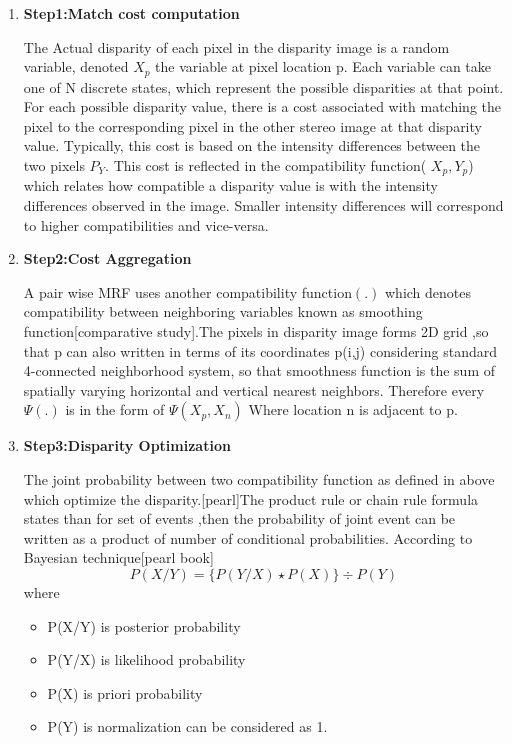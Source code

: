 \begin{enumerate}
  \item \textbf{Step1:Match cost computation}

 The Actual disparity of each pixel in the disparity image is a random variable, denoted $X_{p}$ the variable at pixel location p. Each variable can take one of N discrete states, which represent the possible disparities at that point. For each possible disparity value, there is a cost associated with matching the pixel to the corresponding pixel in the other stereo image at that disparity value. Typically, this cost is based on the intensity differences between the two pixels $ P_{Y}$. This cost is reflected in the compatibility function( $ X_{p} , Y_{p}$) which relates how compatible a disparity value is with the intensity differences observed in the image. Smaller intensity differences will correspond to higher compatibilities and vice-versa.
  \item \textbf{Step2:Cost Aggregation}

A pair wise MRF uses another compatibility function$(.)$ which denotes compatibility between neighboring variables known as smoothing function[comparative study].The pixels in disparity image forms 2D grid ,so that  p can also written in terms of its coordinates p(i,j) considering standard 4-connected neighborhood system, so that smoothness function is  the sum of spatially varying horizontal and vertical nearest neighbors. Therefore every $\Psi(.)$ is in the form of $  \Psi (X_{p},X_{n} )  $ Where location n is adjacent to p.

    \item \textbf{Step3:Disparity Optimization}

  The joint probability between two compatibility function as defined in above which  optimize the disparity.[pearl]The product rule or chain rule formula states than for set of events ,then the probability of joint event can be written as a product of number of conditional probabilities.
According to Bayesian technique[pearl book]
\begin{equation}\label{}
    P(X/Y)=\{P(Y/X)\star P(X)\} \div P(Y)
\end{equation}
    where
    \begin{itemize}
      \item {P(X/Y) is posterior  probability }
      \item {P(Y/X) is likelihood probability}
      \item {P(X) is priori probability}
      \item {P(Y)   is normalization can be considered as 1.}
    \end{itemize}


\end{enumerate}
